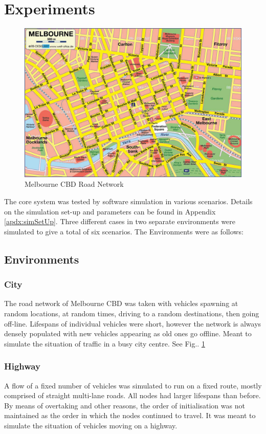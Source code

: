\documentclass[journal]{IEEEtran}
\begin{document}
\section{Experiments}
\begin{figure}[!t]
	\caption{Melbourne CBD Road Network}
	\label{fig:CBDRoads}
	\includegraphics[width=\linewidth,keepaspectratio]{images/cbdmap.jpg}
\end{figure}
\label{sec:Experiments}
The core system was tested by software simulation in various scenarios. Details on the simulation set-up and parameters can be found in Appendix \ref{apdx:simSetUp}. Three different cases in two separate environments were simulated to give a total of six scenarios. The Environments were as follows:
\subsection{Environments}
\label{sec:Experiments:env}
\subsubsection{City}
	The road network of Melbourne CBD was taken with vehicles spawning at random locations, at random times, driving to a random destinations, then going off-line. Lifespans of individual vehicles were short, however the network is always densely populated with new vehicles appearing as old ones go offline.	Meant to simulate the situation of traffic in a busy city centre. See Fig.. \ref{fig:CBDRoads}	
\subsubsection{Highway}
	A flow of a fixed number of vehicles was simulated to run on a fixed route, mostly comprised of straight multi-lane roads. All nodes had larger lifespans than before. By means of overtaking and other reasons, the order of initialisation was not maintained as the order in which the nodes continued to travel. It was meant to simulate the situation of vehicles moving on a highway.
\end{document}
